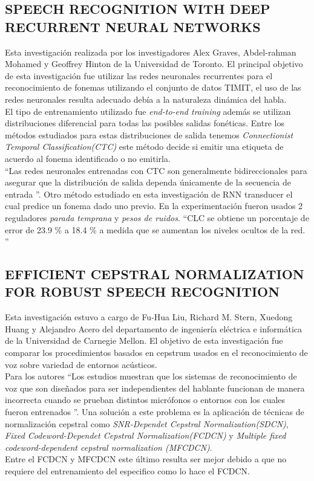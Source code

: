 \subsection{SPEECH RECOGNITION WITH DEEP RECURRENT NEURAL NETWORKS}
Esta investigación realizada por los investigadores Alex Graves, Abdel-rahman Mohamed y Geoffrey Hinton de la Universidad de Toronto. El principal objetivo de esta investigación fue utilizar las redes neuronales recurrentes para el reconocimiento de fonemas utilizando el conjunto de datos TIMIT, el uso de las redes neuronales resulta adecuado debía a la naturaleza dinámica del habla.\\ El tipo de entrenamiento utilizado fue \textit{ end-to-end training} además se utilizan distribuciones diferencial para todas las posibles salidas fonéticas. Entre los métodos estudiados para estas distribuciones de salida tenemos \textit{Connectionist Temporal Classification(CTC)} este método decide si emitir una etiqueta de acuerdo al fonema identificado o no emitirla.\\  \textquotedblleft Las redes neuronales entrenadas con CTC son generalmente bidireccionales para asegurar que la distribución de salida dependa únicamente de la secuencia de entrada \textquotedblright. Otro método estudiado en esta investigación de RNN transducer el cual predice un fonema dado uno previo. En la experimentación fueron usados 2 reguladores \textit{parada temprana} y \textit{pesos de ruidos}. \textquotedblleft CLC se obtiene un porcentaje de error de 23.9 \% a 18.4 \% a medida que se aumentan los niveles ocultos de la red. \textquotedblright

\subsection{EFFICIENT CEPSTRAL NORMALIZATION FOR ROBUST SPEECH RECOGNITION}
Esta investigación estuvo a cargo de Fu-Hua Liu, Richard M. Stern, Xuedong Huang y Alejandro Acero del departamento de ingeniería eléctrica e informática de la Universidad de Carnegie Mellon. El objetivo de esta investigación fue comparar los procedimientos basados en cepstrum usados en el reconocimiento de voz sobre variedad de entornos acústicos.\\ Para los autores \textquotedblleft Los estudios muestran que los sistemas de reconocimiento de voz que son diseñados para ser independientes del hablante funcionan de manera incorrecta cuando se prueban distintos micrófonos o entornos con los cuales fueron entrenados \textquotedblright. Una solución a este problema es la aplicación de técnicas de normalización cepstral como \textit{ SNR-Dependet Cepstral Normalization(SDCN)}, \textit{Fixed Codeword-Dependet Cepstral Normalization(FCDCN)} y \textit{ Multiple fixed codeword-dependent cepstral normalization (MFCDCN)}.\\ Entre el FCDCN y MFCDCN este último resulta ser mejor debido a que no requiere del entrenamiento del especifico como lo hace el FCDCN.

